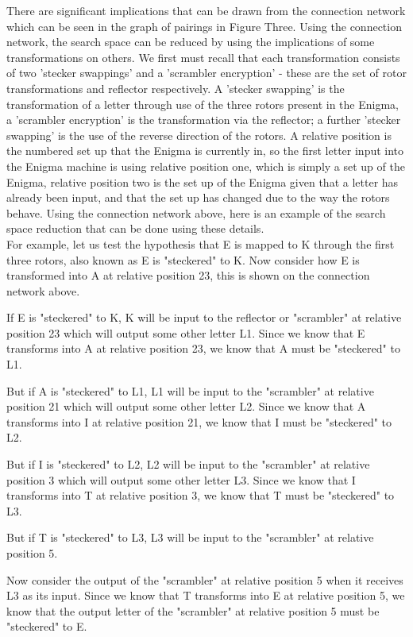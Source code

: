 \documentclass[12pt,a4paper]{article}
\begin{document}
There are significant implications that can be drawn from the connection network which can be seen in the graph of pairings in Figure Three. Using the connection network, the search space can be reduced by using the implications of some transformations on others. We first must recall that each transformation consists of two 'stecker swappings' and a 'scrambler encryption' - these are the set of rotor transformations and reflector respectively. A 'stecker swapping' is the transformation of a letter through use of the three rotors present in the Enigma, a 'scrambler encryption' is the transformation via the reflector; a further 'stecker swapping' is the use of the reverse direction of the rotors. A relative position is the numbered set up that the Enigma is currently in, so the first letter input into the Enigma machine is using relative position one, which is simply a set up of the Enigma, relative position two is the set up of the Enigma given that a letter has already been input, and that the set up has changed due to the way the rotors behave. Using the connection network above, here is an example of the search space reduction that can be done using these details.\\

For example, let us test the hypothesis that E is mapped to K through the first three rotors, also known as E is "steckered" to K. Now consider how E is transformed into A at relative position 23, this is shown on the connection network above.

If E is "steckered" to K, K will be input to the reflector or "scrambler" at relative position 23 which will output some other letter L1. Since we know that E transforms into A at relative position 23, we know that A must be "steckered" to L1.

But if A is "steckered" to L1, L1 will be input to the "scrambler" at relative position 21 which will output some other letter L2. Since we know that A transforms into I at relative position 21, we know that I must be "steckered" to L2.

But if I is "steckered" to L2, L2 will be input to the "scrambler" at relative position 3 which will output some other letter L3. Since we know that I transforms into T at relative position 3, we know that T must be "steckered" to L3.

But if T is "steckered" to L3, L3 will be input to the "scrambler" at relative position 5.

Now consider the output of the "scrambler" at relative position 5 when it receives L3 as its input. Since we know that T transforms into E at relative position 5, we know that the output letter of the "scrambler" at relative position 5 must be "steckered" to E.
\end{document}
